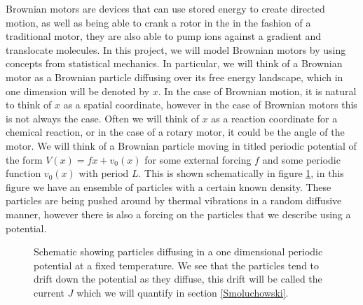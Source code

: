 \documentclass[11pt]{article} %
\begin{document}
Brownian motors are devices that can use stored energy to create directed motion, as well as being able to crank a rotor in the in the fashion of a traditional motor, they are also able to pump ions against a gradient and translocate molecules. In this project, we will model Brownian motors by using concepts from statistical mechanics. In particular, we will think of a Brownian motor as a Brownian particle diffusing over its free energy landscape, which in one dimension will be denoted by $x$. In the case of Brownian motion, it is natural to think of $x$ as a spatial coordinate, however in the case of Brownian motors this is not always the case. Often we will think of $x$ as a reaction coordinate for a chemical reaction, or in the case of a rotary motor, it could be the angle of the motor. We will think of a Brownian particle moving in titled periodic potential of the form $V(x) = f x + v_0(x)$ for some external forcing $f$ and some periodic function $v_0(x)$ with period $L$. This is shown schematically in figure \ref{fig:Schematic}, in this figure we have an ensemble of  particles with a certain known density. These particles are being pushed around by thermal vibrations in a random diffusive manner, however there is also a forcing on the particles that we describe using a potential.

\begin{figure}[tb]
	\centering
\quad
\caption{Schematic showing particles diffusing in a one dimensional periodic potential at a fixed temperature. We see that the particles tend to drift down the potential as they diffuse, this drift will be called the current $J$ which we will quantify in section \ref{Smoluchowski}.}
\label{fig:Schematic} 
\end{figure}
\end{document}
